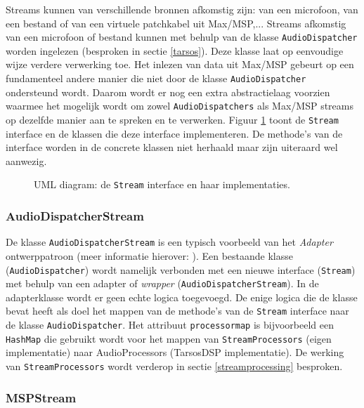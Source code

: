 Streams kunnen van verschillende bronnen afkomstig zijn: van een microfoon, van een bestand of van een virtuele patchkabel uit Max/MSP,... Streams afkomstig van een microfoon of bestand kunnen met behulp van de klasse \texttt{AudioDispatcher} worden ingelezen (besproken in sectie \ref{tarsos}). Deze klasse laat op eenvoudige wijze verdere verwerking toe. Het inlezen van data uit Max/MSP gebeurt op een fundamenteel andere manier die niet door de klasse \texttt{AudioDispatcher} ondersteund wordt. Daarom wordt er nog een extra abstractielaag voorzien waarmee het mogelijk wordt om zowel \texttt{AudioDispatchers} als Max/MSP streams op dezelfde manier aan te spreken en te verwerken. Figuur \ref{StreamUml} toont de \texttt{Stream} interface en de klassen die deze interface implementeren. De methode's van de interface worden in de concrete klassen niet herhaald maar zijn uiteraard wel aanwezig.

\begin{figure}[h!]
	\captionsetup{width=0.7\textwidth}
	\caption[UML diagram van streams]{UML diagram: de \texttt{Stream} interface en haar implementaties.}
	\begin{center}
		\advance\parskip0.3cm
		
	\end{center}
	\label{StreamUml}
\end{figure}

\subsubsection{AudioDispatcherStream}
De klasse \texttt{AudioDispatcherStream} is een typisch voorbeeld van het \textit{Adapter} ontwerppatroon (meer informatie hierover: \cite{vlissides1995design}). Een bestaande klasse (\texttt{AudioDispatcher}) wordt namelijk verbonden met een nieuwe interface (\texttt{Stream}) met behulp van een adapter of \textit{wrapper} (\texttt{AudioDispatcherStream}). In de adapterklasse wordt er geen echte logica toegevoegd. De enige logica die de klasse bevat heeft als doel het mappen van de methode's van de \texttt{Stream} interface naar de klasse \texttt{AudioDispatcher}. Het attribuut \texttt{processormap} is bijvoorbeeld een \texttt{HashMap} die gebruikt wordt voor het mappen van \texttt{StreamProcessors} (eigen implementatie) naar AudioProcessors (TarsosDSP implementatie). De werking van \texttt{StreamProcessors} wordt verderop in sectie \ref{streamprocessing} besproken.

\subsubsection{MSPStream}


